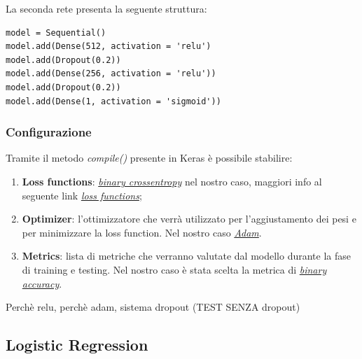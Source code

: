 La seconda rete presenta la seguente struttura:
\begin{lstlisting}[backgroundcolor = \color{white}]
model = Sequential()
model.add(Dense(512, activation = 'relu')
model.add(Dropout(0.2))
model.add(Dense(256, activation = 'relu'))
model.add(Dropout(0.2))
model.add(Dense(1, activation = 'sigmoid'))
\end{lstlisting}


\subsubsection{Configurazione}
Tramite il metodo \textit{compile()} presente in Keras è possibile stabilire:
\begin{enumerate}
	\item \textbf{Loss functions}: \href{https://en.wikipedia.org/wiki/Cross_entropy}{\textit{binary crossentropy}} nel nostro caso, maggiori info al seguente link \href{https://keras.io/losses/}{\textit{loss functions}};
	\item \textbf{Optimizer}: l'ottimizzatore che verrà utilizzato per l'aggiustamento dei pesi e per minimizzare la loss function.
	Nel nostro caso \href{https://arxiv.org/pdf/1412.6980v8.pdf}{\textit{Adam}}. 
	\item \textbf{Metrics}: lista di metriche che verranno valutate dal modello durante la fase di training e testing.
	Nel nostro caso è stata scelta la metrica di \href{https://keras.io/metrics/#binary_accuracy}{\textit{binary accuracy}}.  
\end{enumerate} 

Perchè relu, perchè adam, sistema dropout
(TEST SENZA dropout)
\subsection{Logistic Regression}


